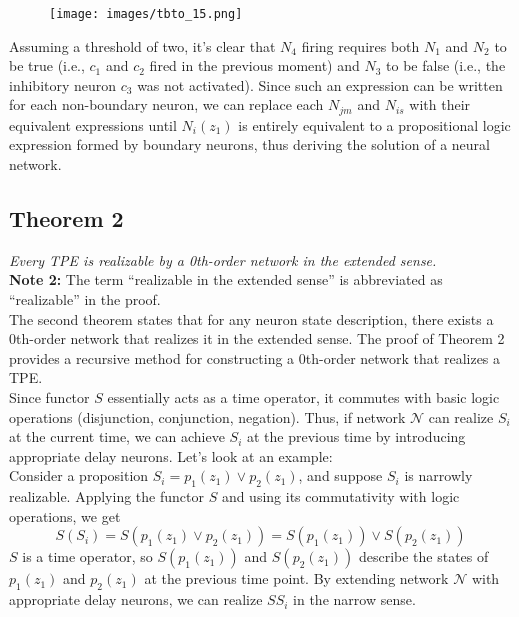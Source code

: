 \documentclass[11p,oneside]{book}
\begin{document}
\begin{figure}[H]
    \centering
    \texttt{[image: images/tbto\_15.png]}
\end{figure}

Assuming a threshold of two, it’s clear that $N_4$ firing requires both $N_1$ and $N_2$ to be true (i.e., $c_1$ and $c_2$ fired in the previous moment) and $N_3$ to be false (i.e., the inhibitory neuron $c_3$ was not activated). Since such an expression can be written for each non-boundary neuron, we can replace each $N_{jm}$ and $N_{is}$ with their equivalent expressions until $N_i(z_1)$ is entirely equivalent to a propositional logic expression formed by boundary neurons, thus deriving the solution of a neural network.

\subsection*{Theorem 2}
\textit{Every TPE is realizable by a 0th-order network in the extended sense.}
\\

\noindent \textbf{Note 2:} The term “realizable in the extended sense” is abbreviated as “realizable” in the proof.
\\

The second theorem states that for any neuron state description, there exists a 0th-order network that realizes it in the extended sense. The proof of Theorem 2 provides a recursive method for constructing a 0th-order network that realizes a TPE.
\\

Since functor $S$ essentially acts as a time operator, it commutes with basic logic operations (disjunction, conjunction, negation). Thus, if network $\mathcal{N}$ can realize $S_i$ at the current time, we can achieve $S_i$ at the previous time by introducing appropriate delay neurons. Let’s look at an example:
\\

Consider a proposition $S_i = p_1(z_1) \lor p_2(z_1)$, and suppose $S_i$ is narrowly realizable. Applying the functor $S$ and using its commutativity with logic operations, we get
\[
S(S_i) = S(p_1(z_1) \lor p_2(z_1)) = S(p_1(z_1)) \lor S(p_2(z_1))
\]
$S$ is a time operator, so $S(p_1(z_1))$ and $S(p_2(z_1))$ describe the states of $p_1(z_1)$ and $p_2(z_1)$ at the previous time point. By extending network $\mathcal{N}$ with appropriate delay neurons, we can realize $SS_i$ in the narrow sense.
\end{document}
